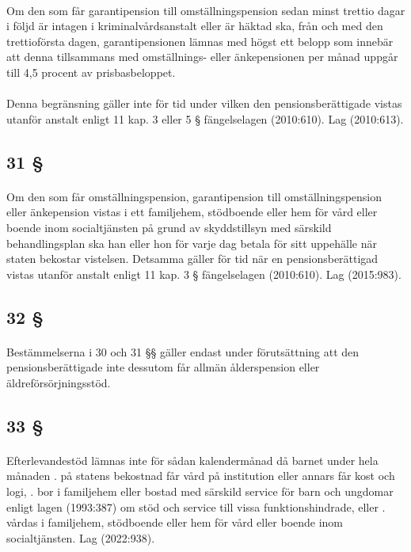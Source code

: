 \documentclass[a4paper,notitlepage,openany,10pt]{book}
\begin{document}
\paragraph*{}
Om den som får garantipension till omställningspension sedan minst trettio dagar i följd är intagen i kriminalvårdsanstalt eller är häktad ska, från och med den trettioförsta dagen, garantipensionen lämnas med högst ett belopp som innebär att denna tillsammans med omställnings- eller änkepensionen per månad uppgår till 4,5 procent av prisbasbeloppet.
\paragraph*{}
Denna begränsning gäller inte för tid under vilken den pensionsberättigade vistas utanför anstalt enligt 11 kap. 3 eller 5 § fängelselagen (2010:610).
Lag (2010:613).
\subsection*{31 §}
\paragraph*{}
Om den som får omställningspension, garantipension till omställningspension eller änkepension vistas i ett familjehem, stödboende eller hem för vård eller boende inom socialtjänsten på grund av skyddstillsyn med särskild behandlingsplan ska han eller hon för varje dag betala för sitt uppehälle när staten bekostar vistelsen. Detsamma gäller för tid när en pensionsberättigad vistas utanför anstalt enligt 11 kap. 3 § fängelselagen (2010:610).
Lag (2015:983).
\subsection*{32 §}
\paragraph*{}
Bestämmelserna i 30 och 31 §§ gäller endast under förutsättning att den pensionsberättigade inte dessutom får allmän ålderspension eller äldreförsörjningsstöd.
\subsection*{33 §}
\paragraph*{}
Efterlevandestöd lämnas inte för sådan kalendermånad då barnet under hela månaden
. på statens bekostnad får vård på institution eller annars får kost och logi,
. bor i familjehem eller bostad med särskild service för barn och ungdomar enligt lagen (1993:387) om stöd och service till vissa funktionshindrade, eller
. vårdas i familjehem, stödboende eller hem för vård eller boende inom socialtjänsten.
Lag (2022:938).
\end{document}
